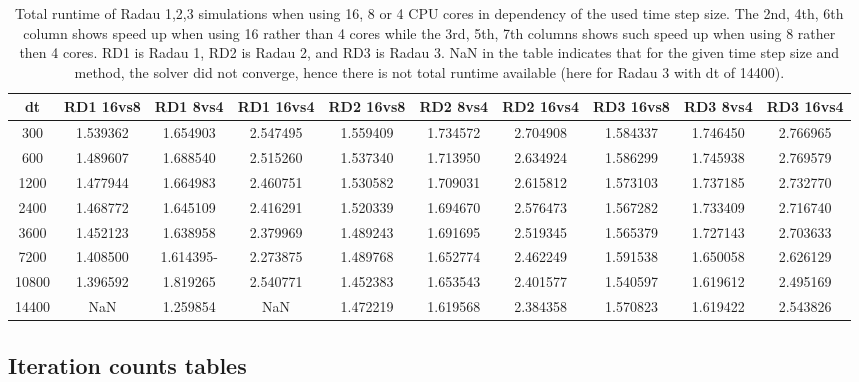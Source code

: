 \documentclass[a4paper, 12pt]{article}
\newcommand{\checkit}[1]{{\color{red}#1}}
\begin{document}
\begin{table}[h]\centering
\begin{scriptsize}
\begin{tabular}{c|c|c|c||c|c|c||c|c|c}
 dt & RD1 16vs8   & RD1  8vs4  & RD1 16vs4 & RD2 16vs8   & RD2  8vs4 & RD2 16vs4 &   RD3 16vs8
 & RD3  8vs4  & RD3 16vs4\\ \hline
   300  &   1.539362 & 1.654903 &2.547495 &  1.559409 & 1.734572 & 2.704908 & 1.584337 &  1.746450  & 2.766965\\
   600  &   1.489607 & 1.688540 & 2.515260& 1.537340 & 1.713950 & 2.634924 &   1.586299 & 1.745938  &2.769579 \\
  1200  &   1.477944 & 1.664983 & 2.460751& 1.530582 & 1.709031 & 2.615812 & 1.573103 & 1.737185 &2.732770 \\
  2400  &  1.468772 & 1.645109  & 2.416291& 1.520339 & 1.694670 & 2.576473 & 1.567282 & 1.733409 & 2.716740\\
  3600  &  1.452123 & 1.638958  & 2.379969& 1.489243 & 1.691695 & 2.519345 & 1.565379 & 1.727143 & 2.703633\\
  7200  & 1.408500 & 1.614395-  & 2.273875&  1.489768&  1.652774 & 2.462249 & 1.591538 & 1.650058 & 2.626129\\
 10800 &   1.396592 & 1.819265  & 2.540771& 1.452383 & 1.653543 & 2.401577 & 1.540597 & 1.619612 &2.495169 \\
 14400 &  NaN      &  1.259854 & NaN & 1.472219 & 1.619568 & 2.384358 &  1.570823 & 1.619422  &2.543826
\end{tabular}
\caption{Total runtime of Radau 1,2,3 simulations when using 16, 8 or 4 CPU cores in dependency of the used time step size.
\checkit{The 2nd, 4th, 6th column shows speed up when using 16 rather than 4 cores while the 3rd, 5th, 7th columns shows such speed up when using 8 rather then 4 cores. RD1 is Radau 1, RD2 is Radau 2, and RD3 is Radau 3. NaN in the table indicates that for the given time step size and method, the solver did not converge, hence there is not total runtime available (here for Radau 3 with dt of 14400).}}
\label{tab_irksrd123_cores}
\end{scriptsize}
\end{table}


\cleardoublepage

\subsection{Iteration counts tables}
\end{document}
